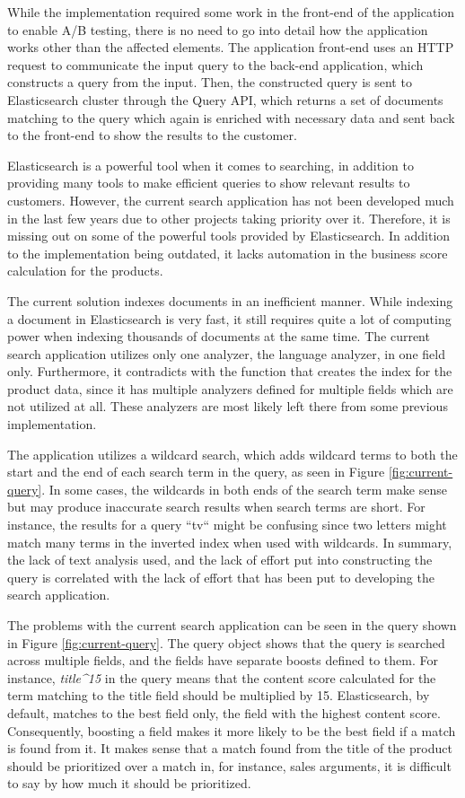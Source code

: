 While the implementation required some work in the front-end of the application to enable A/B testing, 
there is no need to go into detail how the application works other than the affected elements.
The application front-end uses an HTTP request to communicate the input query to the back-end application, 
which constructs a query from the input.
Then, the constructed query is sent to Elasticsearch cluster through the Query API, which returns a set of documents
matching to the query which again is enriched with necessary data and sent back to the front-end to show the results
to the customer.


Elasticsearch is a powerful tool when it comes to searching, in addition to providing many  
tools to make efficient queries to show relevant results to customers.
However, the current search application has not been developed much in the last few years 
due to other projects taking priority over it. 
Therefore, it is missing out on some of the powerful tools provided by Elasticsearch.
In addition to the implementation being outdated, 
it lacks automation in the business score calculation for the products.


The current solution indexes documents in an inefficient manner. 
While indexing a document in Elasticsearch is very fast, it still requires quite a lot of computing 
power when indexing thousands of documents at the same time. 
The current search application utilizes only one analyzer, the language analyzer, in one field only.
Furthermore, it contradicts with the function that creates the index for the product data, since it has
multiple analyzers defined for multiple fields which are not utilized at all.
These analyzers are most likely left there from some previous implementation.


The application utilizes a wildcard search, which adds wildcard terms to both
the start and the end of each search term in the query, as seen in Figure \ref{fig:current-query}.
In some cases, the wildcards in both ends of the search term make sense but may produce 
inaccurate search results when search terms are short.
For instance, the results for a query ``tv`` might be confusing since two letters might match 
many terms in the inverted index when used with wildcards.
In summary, the lack of text analysis used, and the lack of effort put into constructing the query is 
correlated with the lack of effort that has been put to developing the search application.


The problems with the current search application can be seen in the query shown in Figure \ref{fig:current-query}.
The query object shows that the query is searched across multiple fields, 
and the fields have separate boosts defined to them. 
For instance, \emph{title\textasciicircum15} in the query means that the content score calculated for the term matching to the title field
should be multiplied by 15.
Elasticsearch, by default, matches to the best field only, 
the field with the highest content score.
Consequently, boosting a field makes it more likely to be the best field if a match is found from it.
It makes sense that a match found from the title of the product should be prioritized over
a match in, for instance, sales arguments, it is difficult to say by how much it should be prioritized.


